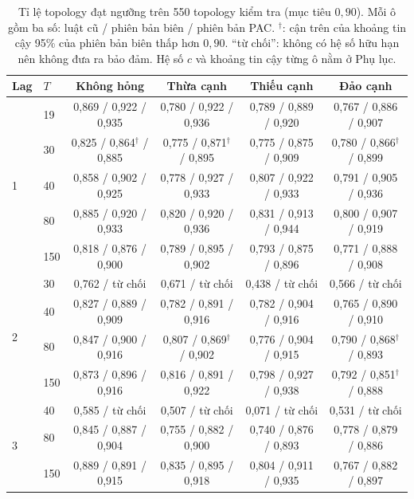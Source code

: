 \begin{table}[H]
\centering
\caption{Tỉ lệ topology đạt ngưỡng trên 550 topology kiểm tra (mục tiêu $0{,}90$). Mỗi ô gồm ba số: luật cũ / phiên bản biên / phiên bản PAC. $^{\dagger}$: cận trên của khoảng tin cậy 95\% của phiên bản biên thấp hơn $0{,}90$. ``từ chối'': không có hệ số hữu hạn nên không đưa ra bảo đảm. Hệ số $c$ và khoảng tin cậy từng ô nằm ở Phụ lục.}\label{tab:guarantee-compact}
{\footnotesize
\setlength{\tabcolsep}{3.5pt}
\begin{tabular}{llcccc}
\toprule
Lag & $T$ & Không hỏng & Thừa cạnh & Thiếu cạnh & Đảo cạnh \\
\midrule
\multirow{5}{*}{1} & 19 & 0,869 / 0,922 / 0,935 & 0,780 / 0,922 / 0,936 & 0,789 / 0,889 / 0,920 & 0,767 / 0,886 / 0,907 \\
 & 30 & 0,825 / 0,864$^{\dagger}$ / 0,885 & 0,775 / 0,871$^{\dagger}$ / 0,895 & 0,775 / 0,875 / 0,909 & 0,780 / 0,866$^{\dagger}$ / 0,899 \\
 & 40 & 0,858 / 0,902 / 0,925 & 0,778 / 0,927 / 0,933 & 0,807 / 0,922 / 0,933 & 0,791 / 0,905 / 0,936 \\
 & 80 & 0,885 / 0,920 / 0,933 & 0,820 / 0,920 / 0,936 & 0,831 / 0,913 / 0,944 & 0,800 / 0,907 / 0,919 \\
 & 150 & 0,818 / 0,876 / 0,900 & 0,789 / 0,895 / 0,902 & 0,793 / 0,875 / 0,896 & 0,771 / 0,888 / 0,908 \\
\midrule
\multirow{4}{*}{2} & 30 & 0,762 / từ chối & 0,671 / từ chối & 0,438 / từ chối & 0,566 / từ chối \\
 & 40 & 0,827 / 0,889 / 0,909 & 0,782 / 0,891 / 0,916 & 0,782 / 0,904 / 0,916 & 0,765 / 0,890 / 0,910 \\
 & 80 & 0,847 / 0,900 / 0,916 & 0,807 / 0,869$^{\dagger}$ / 0,902 & 0,776 / 0,904 / 0,915 & 0,790 / 0,868$^{\dagger}$ / 0,893 \\
 & 150 & 0,873 / 0,896 / 0,916 & 0,816 / 0,891 / 0,922 & 0,798 / 0,927 / 0,938 & 0,792 / 0,851$^{\dagger}$ / 0,888 \\
\midrule
\multirow{3}{*}{3} & 40 & 0,585 / từ chối & 0,507 / từ chối & 0,071 / từ chối & 0,531 / từ chối \\
 & 80 & 0,845 / 0,887 / 0,904 & 0,755 / 0,882 / 0,900 & 0,740 / 0,876 / 0,893 & 0,778 / 0,879 / 0,886 \\
 & 150 & 0,889 / 0,891 / 0,915 & 0,835 / 0,895 / 0,918 & 0,804 / 0,911 / 0,935 & 0,767 / 0,882 / 0,897 \\
\bottomrule
\end{tabular}
}
\end{table}
